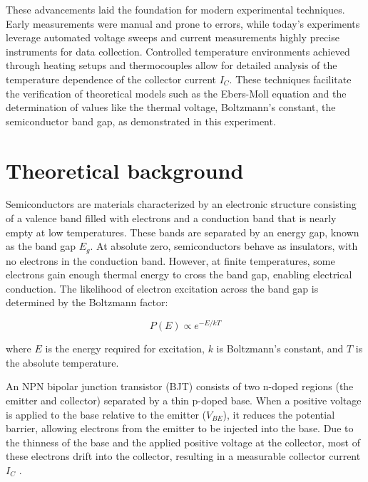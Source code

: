 \documentclass[12pt,letterpaper,twocolumn]{article}
\begin{document}
These advancements laid the foundation for modern experimental techniques. Early measurements were manual and prone to errors, while today’s experiments leverage automated voltage sweeps and current measurements highly precise instruments for data collection. Controlled temperature environments achieved through heating setups and thermocouples allow for detailed analysis of the temperature dependence of the collector current \(I_C\). These techniques facilitate the verification of theoretical models such as the Ebers-Moll equation and the determination of values like the thermal voltage, Boltzmann's constant, the semiconductor band gap, as demonstrated in this experiment\cite{Grundmann}.



\section{Theoretical background}

Semiconductors are materials characterized by an electronic structure consisting of a valence band filled with electrons and a conduction band that is nearly empty at low temperatures. These bands are separated by an energy gap, known as the band gap \( E_g \). At absolute zero, semiconductors behave as insulators, with no electrons in the conduction band. However, at finite temperatures, some electrons gain enough thermal energy to cross the band gap, enabling electrical conduction. The likelihood of electron excitation across the band gap is determined by the Boltzmann factor:

\begin{equation}
P(E) \propto e^{-E/kT}
\end{equation}

where \( E \) is the energy required for excitation, \( k \) is Boltzmann’s constant, and \( T \) is the absolute temperature\cite{Thornton}.

An NPN bipolar junction transistor (BJT) consists of two n-doped regions (the emitter and collector) separated by a thin p-doped base. When a positive voltage is applied to the base relative to the emitter (\( V_{BE} \)), it reduces the potential barrier, allowing electrons from the emitter to be injected into the base. Due to the thinness of the base and the applied positive voltage at the collector, most of these electrons drift into the collector, resulting in a measurable collector current \( I_C \) \cite{Neudeck}.
\end{document}
